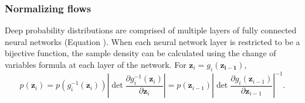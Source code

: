 \documentclass[11pt]{article}
\begin{document}
\subsubsection{Normalizing flows}\label{methods_NF}
Deep probability distributions are comprised of multiple layers of fully connected neural networks (Equation \label{eq:deep_transform}).
When each neural network layer is restricted to be a bijective function, the sample density can be calculated using the change of variables formula at each layer of the network.  For $\mathbf{z}_i = g_i(\mathbf{z_{i-1}})$,
\begin{equation}
p(\mathbf{z}_i) = p(g_i^{-1}(\mathbf{z}_i)) \left| \det \frac{\partial g_i^{-1}(\mathbf{z}_i)}{\partial \mathbf{z}_i} \right| = p(\mathbf{z}_{i-1}) \left| \det \frac{\partial g_i(\mathbf{z}_{i-1})}{\partial \mathbf{z}_{i-1}} \right|^{-1}.
\end{equation}
\end{document}
